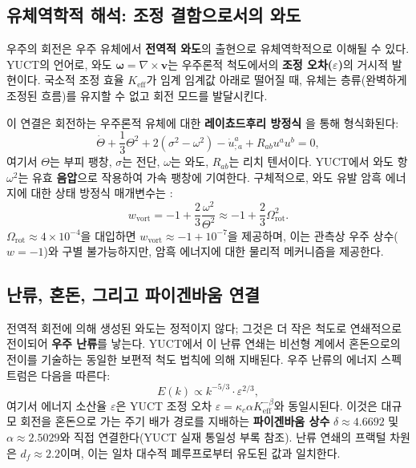 \documentclass[11pt,a4paper]{article}
\begin{document}
	\subsection{유체역학적 해석: 조정 결함으로서의 와도}
	
	우주의 회전은 우주 유체에서 \textbf{전역적 와도}의 출현으로 유체역학적으로 이해될 수 있다. YUCT의 언어로, 와도 \(\boldsymbol{\omega} = \nabla \times \mathbf{v}\)는 우주론적 척도에서의 \textbf{조정 오차(\(\varepsilon\))}의 거시적 발현이다. 국소적 조정 효율 \(K_{\mathrm{eff}}\)가 임계 임계값 아래로 떨어질 때, 유체는 층류(완벽하게 조정된 흐름)를 유지할 수 없고 회전 모드를 발달시킨다.
	
	이 연결은 회전하는 우주론적 유체에 대한 \textbf{레이쵸드후리 방정식} \cite{Ellis1971}을 통해 형식화된다:
	\begin{equation}
		\dot{\Theta} + \frac{1}{3}\Theta^2 + 2(\sigma^2 - \omega^2) - \dot{u}^a_{;a} + R_{ab}u^a u^b = 0,
	\end{equation}
	여기서 \(\Theta\)는 부피 팽창, \(\sigma\)는 전단, \(\omega\)는 와도, \(R_{ab}\)는 리치 텐서이다. YUCT에서 와도 항 \(\omega^2\)는 유효 \textbf{음압}으로 작용하여 가속 팽창에 기여한다. 구체적으로, 와도 유발 암흑 에너지에 대한 상태 방정식 매개변수는 \cite{Tsagas2011}:
	\begin{equation}
		w_{\mathrm{vort}} = -1 + \frac{2}{3}\frac{\omega^2}{\Theta^2} \approx -1 + \frac{2}{3}\Omega_{\mathrm{rot}}^2.
	\end{equation}
	\(\Omega_{\mathrm{rot}} \approx 4 \times 10^{-4}\)을 대입하면 \(w_{\mathrm{vort}} \approx -1 + 10^{-7}\)을 제공하며, 이는 관측상 우주 상수(\(w = -1\))와 구별 불가능하지만, 암흑 에너지에 대한 물리적 메커니즘을 제공한다.
	
	\subsection{난류, 혼돈, 그리고 파이겐바움 연결}
	
	전역적 회전에 의해 생성된 와도는 정적이지 않다; 그것은 더 작은 척도로 연쇄적으로 전이되어 \textbf{우주 난류}를 낳는다. YUCT에서 이 난류 연쇄는 비선형 계에서 혼돈으로의 전이를 기술하는 동일한 보편적 척도 법칙에 의해 지배된다. 우주 난류의 에너지 스펙트럼은 다음을 따른다:
	\begin{equation}
		E(k) \propto k^{-5/3} \cdot \varepsilon^{2/3},
	\end{equation}
	여기서 에너지 소산율 \(\varepsilon\)은 YUCT 조정 오차 \(\varepsilon = \kappa_c \alpha K_{\mathrm{eff}}^{-\beta}\)와 동일시된다. 이것은 대규모 회전을 혼돈으로 가는 주기 배가 경로를 지배하는 \textbf{파이겐바움 상수} \(\delta \approx 4.6692\) 및 \(\alpha \approx 2.5029\)와 직접 연결한다(YUCT 실재 통일성 부록 참조). 난류 연쇄의 프랙털 차원은 \(d_f \approx 2.2\)이며, 이는 일차 대수적 폐루프로부터 유도된 값과 일치한다.
	
\end{document}
